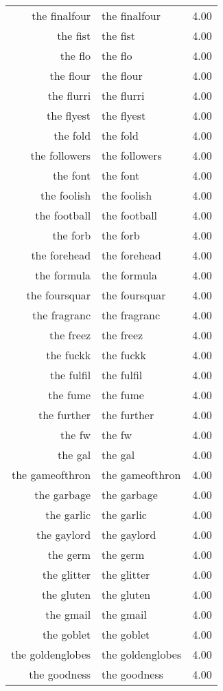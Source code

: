 \begin{table}[ht]
\begin{tabular}{rlr}
  the finalfour & the finalfour & 4.00 \\ 
  the fist & the fist & 4.00 \\ 
  the flo & the flo & 4.00 \\ 
  the flour & the flour & 4.00 \\ 
  the flurri & the flurri & 4.00 \\ 
  the flyest & the flyest & 4.00 \\ 
  the fold & the fold & 4.00 \\ 
  the followers & the followers & 4.00 \\ 
  the font & the font & 4.00 \\ 
  the foolish & the foolish & 4.00 \\ 
  the football & the football & 4.00 \\ 
  the forb & the forb & 4.00 \\ 
  the forehead & the forehead & 4.00 \\ 
  the formula & the formula & 4.00 \\ 
  the foursquar & the foursquar & 4.00 \\ 
  the fragranc & the fragranc & 4.00 \\ 
  the freez & the freez & 4.00 \\ 
  the fuckk & the fuckk & 4.00 \\ 
  the fulfil & the fulfil & 4.00 \\ 
  the fume & the fume & 4.00 \\ 
  the further & the further & 4.00 \\ 
  the fw & the fw & 4.00 \\ 
  the gal & the gal & 4.00 \\ 
  the gameofthron & the gameofthron & 4.00 \\ 
  the garbage & the garbage & 4.00 \\ 
  the garlic & the garlic & 4.00 \\ 
  the gaylord & the gaylord & 4.00 \\ 
  the germ & the germ & 4.00 \\ 
  the glitter & the glitter & 4.00 \\ 
  the gluten & the gluten & 4.00 \\ 
  the gmail & the gmail & 4.00 \\ 
  the goblet & the goblet & 4.00 \\ 
  the goldenglobes & the goldenglobes & 4.00 \\ 
  the goodness & the goodness & 4.00 \\ 

\end{tabular}
\end{table}
